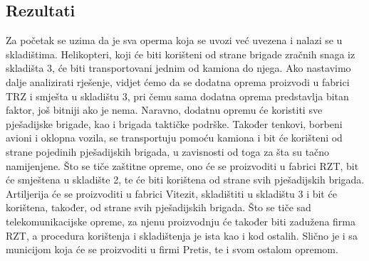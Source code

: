 \documentclass{article}
\begin{document}
\subsection{Rezultati}
Za početak se uzima da je sva operma koja se uvozi već uvezena i nalazi se u skladištima. Helikopteri, koji će biti korišteni od strane brigade zračnih snaga iz skladišta 3, će biti transportovani jednim od kamiona do njega. Ako nastavimo dalje analizirati rješenje, vidjet ćemo da se dodatna oprema proizvodi u fabrici TRZ i smješta u skladištu 3, pri čemu sama dodatna oprema predstavlja bitan faktor, još bitniji ako je nema. Naravno, dodatnu opremu će koristiti sve pješadijske brigade, kao i brigada taktičke podrške. Također tenkovi, borbeni avioni i oklopna vozila, se transportuju pomoću kamiona i bit će korišteni od strane pojedinih pješadijskih brigada, u zavisnosti od toga za šta su tačno namijenjene. Što se tiče zaštitne opreme, ono će se proizvoditi u fabrici RZT, bit će smještena u skladište 2, te će biti korištena od strane svih pješadijskih brigada. Artiljerija će se proizvoditi u fabrici Vitezit, skladištiti u skladištu 3 i bit će korištena, također, od strane svih pješadijskih brigada. Što se tiče sad telekomunikacijske opreme, za njenu proizvodnju će također biti zadužena firma RZT, a procedura korištenja i skladištenja je ista kao i kod ostalih. Slično je i sa municijom koja će se proizvoditi u firmi Pretis, te i svom ostalom opremom.
\end{document}
